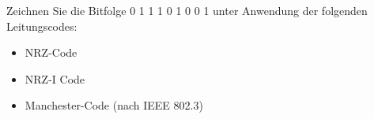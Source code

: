 
Zeichnen Sie die Bitfolge 0 1 1 1 0 1 0 0 1 unter Anwendung der folgenden Leitungscodes:
\begin{itemize}
    \item NRZ-Code
    \item NRZ-I Code
    \item Manchester-Code (nach IEEE 802.3)
\end{itemize}
